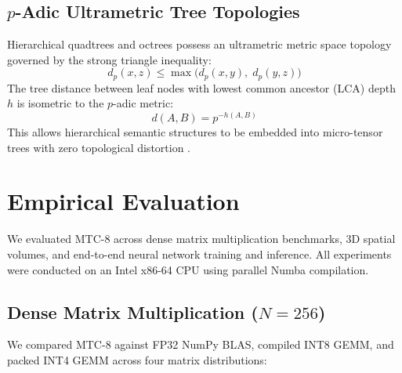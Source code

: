 \documentclass[11pt,a4paper]{article}
\begin{document}
\subsection{\texorpdfstring{$p$}{p}-Adic Ultrametric Tree Topologies}
Hierarchical quadtrees and octrees possess an ultrametric metric space topology governed by the strong triangle inequality:
\begin{equation}
d_p(x, z) \le \max\big(d_p(x, y), \; d_p(y, z)\big)
\end{equation}
The tree distance between leaf nodes with lowest common ancestor (LCA) depth $h$ is isometric to the $p$-adic metric:
\begin{equation}
d(A, B) = p^{-h(A, B)}
\end{equation}
This allows hierarchical semantic structures to be embedded into micro-tensor trees with zero topological distortion \cite{khrennikov1997non}.

\section{Empirical Evaluation}

We evaluated MTC-8 across dense matrix multiplication benchmarks, 3D spatial volumes, and end-to-end neural network training and inference. All experiments were conducted on an Intel x86-64 CPU using parallel Numba compilation.

\subsection{Dense Matrix Multiplication (\texorpdfstring{$N=256$}{N=256})}

We compared MTC-8 against FP32 NumPy BLAS, compiled INT8 GEMM, and packed INT4 GEMM across four matrix distributions:
\end{document}
